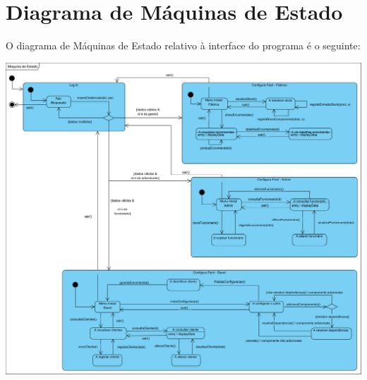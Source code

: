 \documentclass[11pt]{article} %
\begin{document}
\section{Diagrama de Máquinas de Estado}
O diagrama de Máquinas de Estado relativo à interface do programa é o seguinte:
	\begin{center}
		\includegraphics[width = 6.2in]{Maquina_de_Estado.png}
	\end{center}
	
\newpage
\end{document}
